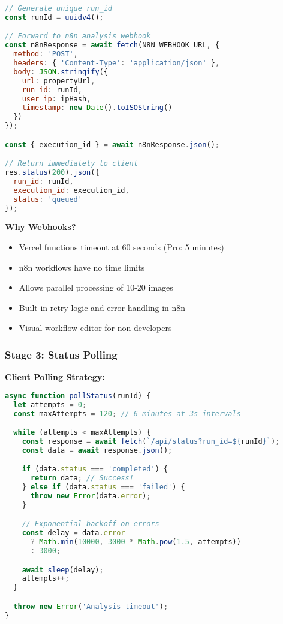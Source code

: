 \documentclass[11pt,a4paper]{article}
\begin{document}
\begin{lstlisting}[language=JavaScript, caption=n8n Webhook Invocation]
// Generate unique run_id
const runId = uuidv4();

// Forward to n8n analysis webhook
const n8nResponse = await fetch(N8N_WEBHOOK_URL, {
  method: 'POST',
  headers: { 'Content-Type': 'application/json' },
  body: JSON.stringify({
    url: propertyUrl,
    run_id: runId,
    user_ip: ipHash,
    timestamp: new Date().toISOString()
  })
});

const { execution_id } = await n8nResponse.json();

// Return immediately to client
res.status(200).json({
  run_id: runId,
  execution_id: execution_id,
  status: 'queued'
});
\end{lstlisting}

\textbf{Why Webhooks?}
\begin{itemize}
  \item Vercel functions timeout at 60 seconds (Pro: 5 minutes)
  \item n8n workflows have no time limits
  \item Allows parallel processing of 10-20 images
  \item Built-in retry logic and error handling in n8n
  \item Visual workflow editor for non-developers
\end{itemize}

\subsubsection{Stage 3: Status Polling}

\textbf{Client Polling Strategy:}
\begin{lstlisting}[language=JavaScript, caption=Exponential Backoff Polling]
async function pollStatus(runId) {
  let attempts = 0;
  const maxAttempts = 120; // 6 minutes at 3s intervals

  while (attempts < maxAttempts) {
    const response = await fetch(`/api/status?run_id=${runId}`);
    const data = await response.json();

    if (data.status === 'completed') {
      return data; // Success!
    } else if (data.status === 'failed') {
      throw new Error(data.error);
    }

    // Exponential backoff on errors
    const delay = data.error
      ? Math.min(10000, 3000 * Math.pow(1.5, attempts))
      : 3000;

    await sleep(delay);
    attempts++;
  }

  throw new Error('Analysis timeout');
}
\end{lstlisting}
\end{document}
